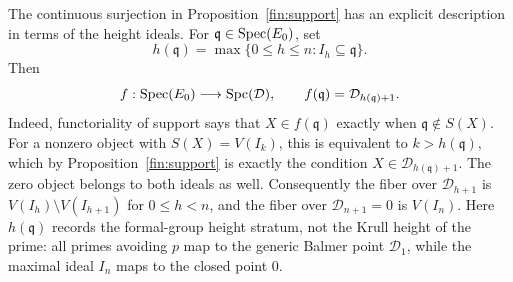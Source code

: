 The continuous surjection in Proposition~\ref{fin:support} has an
explicit description in terms of the height ideals.  For
$\mathfrak q\in\operatorname{Spec}(E_0)$, set
\[
 h(\mathfrak q)=\max\{0\leq h\leq n:I_h\subseteq\mathfrak q\}.
\]
Then
\[
 f:\operatorname{Spec}(E_0)\longrightarrow\operatorname{Spc}(\mathcal D),\qquad
 f(\mathfrak q)=\mathcal D_{h(\mathfrak q)+1}.
\]
Indeed, functoriality of support says that
$X\in f(\mathfrak q)$ exactly when $\mathfrak q\notin S(X)$.
For a nonzero object with $S(X)=V(I_k)$, this is equivalent to
$k>h(\mathfrak q)$, which by Proposition~\ref{fin:support} is
exactly the condition $X\in\mathcal D_{h(\mathfrak q)+1}$.
The zero object belongs to both ideals as well.
Consequently the fiber over $\mathcal D_{h+1}$ is
$V(I_h)\setminus V(I_{h+1})$ for $0\leq h<n$, and the fiber over
$\mathcal D_{n+1}=0$ is $V(I_n)$.
Here $h(\mathfrak q)$ records the formal-group height stratum, not the
Krull height of the prime: all primes avoiding $p$ map to the generic
Balmer point $\mathcal D_1$, while the maximal ideal $I_n$ maps to
the closed point $0$.
